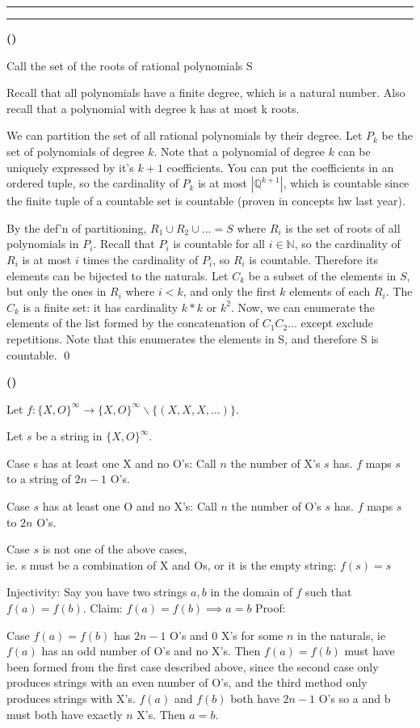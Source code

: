 \documentclass[11pt]{article}
\newcounter{questionCounter}
\newcounter{partCounter}[questionCounter]
\newenvironment{question}[2][\arabic{questionCounter}]{%
    \setcounter{partCounter}{0}%
    \vspace{.25in} \hrule \vspace{0.5em}%
        \noindent{\bf #2}%
    \vspace{0.8em} \hrule \vspace{.10in}%
    \addtocounter{questionCounter}{1}%
}{}
\renewenvironment{part}[1][\alph{partCounter}]{%
    \addtocounter{partCounter}{1}%
    \vspace{.10in}%
    \begin{indented}%
       {\bf (#1)} %
}{\end{indented}}
\begin{document}
\begin{question}{Hope and Comfort}
\begin{part}
Call the set of the roots of rational polynomials S

Recall that all polynomials have a finite degree, which is a natural number.
Also recall that a polynomial with degree k has at most k roots.

We can partition the set of all rational polynomials by their degree.
Let $P_k$ be the set of polynomials of degree $k$. Note that a polynomial
of degree $k$ can be uniquely expressed by it's $k+1$ coefficients. You can put
the coefficients in an ordered tuple, so the cardinality of $P_k$ is at most $|\mathbb{Q}^{k+1}|$, which
is countable since the finite tuple of a countable set is countable (proven in concepts hw last year).

By the def'n of partitioning, $R_1 \cup R_2 \cup ... = S$ where $R_i$ is the set of roots of all polynomials in $P_i$. 
Recall that $P_i$ is countable for all $i\in\mathbb{N}$, so the cardinality of $R_i$ is at most $i$ times
the cardinality of $P_i$, so $R_i$ is countable. Therefore its elements can be bijected to the naturals.
Let $C_k$ be a subset of the elements in $S$, but only the ones in $R_i$ where $i < k$, and only the first $k$ elements 
of each $R_i$. The $C_k$ is a finite set: it has cardinality  $k*k$ or $k^2$.  
Now, we can enumerate the elements of the list formed by the concatenation of $C_1C_2...$ except exclude repetitions. Note that this 
enumerates the elements in S, and therefore S is countable. \qed
\end{part}
\begin{part}
Let $f: \{X,O\}^{\infty} \rightarrow \{X,O\}^{\infty} \backslash
\{(X,X,X,\dots)\}$.

Let $s$ be a string in $\{X,O\}^{\infty}$.

Case s has at least one X and no O's: Call $n$ the number of X's $s$ has.
$f$ maps $s$ to a string of $2n-1$ O's.

Case $s$ has at least one O and no X's: Call $n$ the number of O's $s$ has.
$f$ maps $s$ to $2n$ O's.

Case $s$ is not one of the above cases,\\
ie. s must be a combination of X and Os, or it is the empty string:
$f(s) = s$

Injectivity:
Say you have two strings $a,b$ in the domain of $f$ such that $f(a) = f(b)$.
Claim: $f(a)=f(b) \implies a = b$
Proof:

Case $f(a)=f(b)$ has $2n-1$ O's and 0 X's for some $n$ in the naturals, ie $f(a)$ has an odd number of O's and no X's.
Then $f(a)=f(b)$ must have been formed from the first case described above, since the second case only produces
strings with an even number of O's, and the third method only produces strings with X's. $f(a)$ and $f(b)$ both
have $2n-1$ O's so a and b must both have exactly $n$ X's. Then $a=b$.


\end{part}
\end{question}
\end{document}
